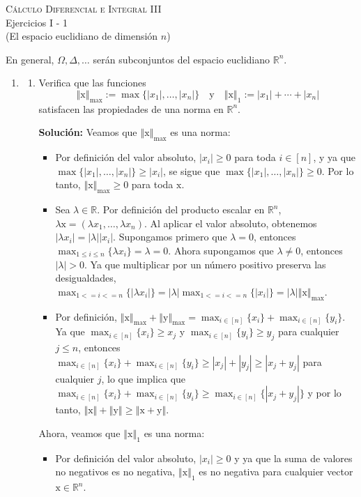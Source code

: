 \documentclass[12pt]{article}
\newcommand{\abs}[1]{\left\vert#1\right\vert}
\newcommand{\norm}[1]{\left\Vert#1\right\Vert}
\newcommand{\R}{\mathbb R}
\newcommand{\x}{\mathrm x}
\newcommand{\y}{\mathrm y}
\begin{document}
\pagestyle{empty}
\begin{center}
{\textsc{Cálculo Diferencial e Integral III} \\
\medskip 
\large{Ejercicios I - 1 \\
(El espacio euclidiano de dimensión $n$)}}
\end{center}
\bigskip

En general, $\Omega,\Delta, \dots$ serán subconjuntos del espacio euclidiano $\R^n$.

\begin{enumerate}

\item 
\begin{enumerate}[(1)]
\item Verifica que las funciones
\[ 
\norm{\x}_{\max} := \max\{\abs{x_1},\ldots,\abs{x_n}\} \quad \text{y}\quad 
\norm{\x}_1 := \abs{x_1} + \cdots + \abs{x_n} 
\]
satisfacen las propiedades de una norma en $\R^n$.

\textbf{Solución: } Veamos que \(\norm{\x}_{\max}\) es una norma:
    \begin{itemize}
        \item Por definición del valor absoluto, \(\abs{x_i} \geq 0\) para toda \(i \in [n]\), y ya que \(\max\{\abs{x_1}, \dots, \abs{x_n}\} \geq \abs{x_i}\), se sigue que \(\max\{\abs{x_1}, \dots, \abs{x_n}\} \geq 0\). Por lo tanto, \(\norm{\x}_{\max} \geq 0\) para toda \(\x\).
        \item Sea \(\lambda \in \R\). Por definición del producto escalar en \(\R^n\), \(\lambda \x = (\lambda x_1, \dots, \lambda x_n)\). Al aplicar el valor absoluto, obtenemos \(\abs{\lambda x_i} = \abs{\lambda} \abs{x_i}\). Supongamos primero que \(\lambda = 0\), entonces \(\max_{1 \leq i \leq n} \{\lambda x_i\} = \lambda = 0\). Ahora supongamos que \(\lambda \neq 0\), entonces \(\abs{\lambda} > 0\). Ya que multiplicar por un número positivo preserva las desigualdades, \(\max_{1 <= i <= n}\{\abs{\lambda x_i}\} = \abs{\lambda} \max_{1 <= i <= n}\{\abs{x_i}\} = \abs{\lambda} \norm{\x}_{\max}\).
        \item Por definición, \(\norm{\x}_{\max} + \norm{\y}_{\max} = \max_{i\in[n]}\{x_i\} + \max_{i\in[n]}\{y_i\}\). Ya que \(\max_{i\in[n]}\{x_i\} \geq x_j\) y \(\max_{i\in[n]}\{y_i\} \geq y_j\) para cualquier \(j \leq n\), entonces \(\max_{i\in[n]}\{x_i\} + \max_{i\in[n]}\{y_i\} \geq \abs{x_j} + \abs{y_j} \geq \abs{x_j + y_j}\) para cualquier \(j\), lo que implica que \(\max_{i\in[n]}\{x_i\} + \max_{i\in[n]}\{y_i\} \geq \max_{i \in [n]}\{\abs{x_j + y_j}\}\) y por lo tanto, \(\norm{\x} + \norm{\y} \geq \norm{\x + \y}\).
    \end{itemize}
Ahora, veamos que \(\norm{\x}_1\) es una norma:
\begin{itemize}
    \item Por definición del valor absoluto, \(\abs{x_i} \geq 0\) y ya que la suma de valores no negativos es no negativa, \(\norm{\x}_1\) es no negativa para cualquier vector \(\x \in \R^n\).
    

\end{itemize}
\end{enumerate}
\end{enumerate}
\end{document}
